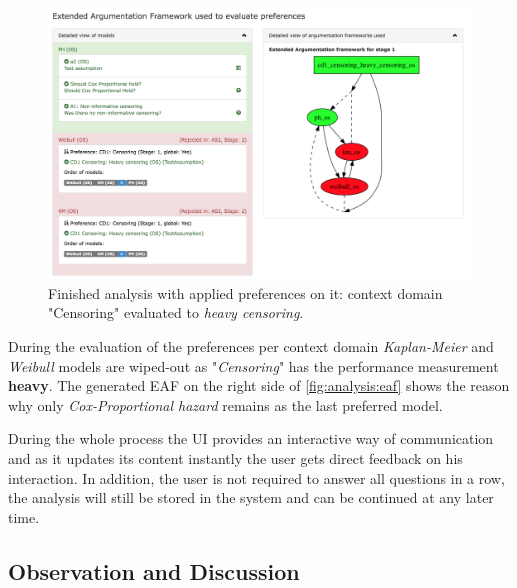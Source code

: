 \begin{figure}[!ht]
	\centering
	\includegraphics[width=\textwidth]{figures/ui_analysis_eaf}
	\caption{Finished analysis with applied preferences on it: context domain "Censoring" evaluated to \textit{heavy censoring}. }
	\label{fig:analysis:eaf}
\end{figure}


During the evaluation of the preferences per context domain \textit{Kaplan-Meier} and \textit{Weibull} models are wiped-out as "\textit{Censoring}" has the performance measurement \textbf{heavy}. The generated \gls{EAF} on the right side of \autoref{fig:analysis:eaf} shows the reason why only \textit{Cox-Proportional hazard} remains as the last preferred model.


During the whole process the \gls{UI} provides an interactive way of communication and as it updates its content instantly the user gets direct feedback on his interaction. In addition, the user is not required to answer all questions in a row, the analysis will still be stored in the system and can be continued at any later time. 





\subsection{Observation and Discussion}



